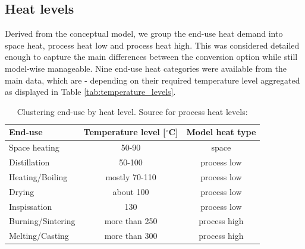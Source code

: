 \documentclass[review]{elsarticle}
\begin{document}




\subsection{Heat levels}
Derived from the conceptual model, we group the end-use heat demand into space heat, process heat low and process heat high. This was considered detailed enough to capture the main differences between the conversion option while still model-wise manageable. Nine end-use heat categories were available from the main data, which are - depending on their required temperature level aggregated as displayed in Table \autoref{tab:temperature_levels}.

\begin{table}
\begin{tabular}{l | c | c}
End-use & Temperature level [$^{\circ}$C] & Model heat type\\
\hline \hline
Space heating & 50-90 & space  \\ 
Distillation & 50-100 & process low \\
Heating/Boiling & mostly 70-110 & process low \\
Drying & about 100 & process low \\
Inspissation & 130 & process low \\ 
Burning/Sintering & more than 250 & process high \\ 
Melting/Casting & more than 300 & process high  
\end{tabular}
\caption{Clustering end-use by heat level. Source for process heat levels: \cite{VM2015}}
\label{tab:temperature_levels} 
\end{table}
\end{document}
